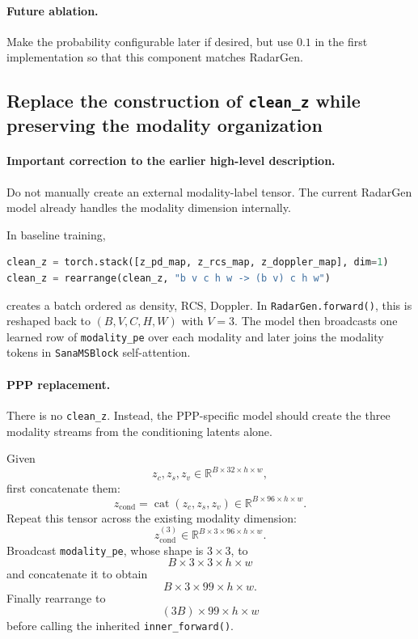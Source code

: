 \documentclass[11pt,a4paper]{article}
\begin{document}
\paragraph{Future ablation.}
Make the probability configurable later if desired, but use \(0.1\) in the first implementation so that this component matches RadarGen.

\subsection{Replace the construction of \texttt{clean\_z} while preserving the modality organization}

\paragraph{Important correction to the earlier high-level description.}
Do not manually create an external modality-label tensor. The current RadarGen model already handles the modality dimension internally.

In baseline training,
\begin{lstlisting}[language=Python]
clean_z = torch.stack([z_pd_map, z_rcs_map, z_doppler_map], dim=1)
clean_z = rearrange(clean_z, "b v c h w -> (b v) c h w")
\end{lstlisting}
creates a batch ordered as density, RCS, Doppler. In \texttt{RadarGen.forward()}, this is reshaped back to \((B,V,C,H,W)\) with \(V=3\). The model then broadcasts one learned row of \texttt{modality\_pe} over each modality and later joins the modality tokens in \texttt{SanaMSBlock} self-attention.

\paragraph{PPP replacement.}
There is no \texttt{clean\_z}. Instead, the PPP-specific model should create the three modality streams from the conditioning latents alone.

Given
\[
    z_c,z_s,z_v\in\mathbb R^{B\times32\times h\times w},
\]
first concatenate them:
\[
    z_{\mathrm{cond}}
    =
    \operatorname{cat}(z_c,z_s,z_v)
    \in\mathbb R^{B\times96\times h\times w}.
\]
Repeat this tensor across the existing modality dimension:
\[
    z_{\mathrm{cond}}^{(3)}
    \in
    \mathbb R^{B\times3\times96\times h\times w}.
\]
Broadcast \texttt{modality\_pe}, whose shape is \(3\times3\), to
\[
    B\times3\times3\times h\times w
\]
and concatenate it to obtain
\[
    B\times3\times99\times h\times w.
\]
Finally rearrange to
\[
    (3B)\times99\times h\times w
\]
before calling the inherited \texttt{inner\_forward()}.
\end{document}
